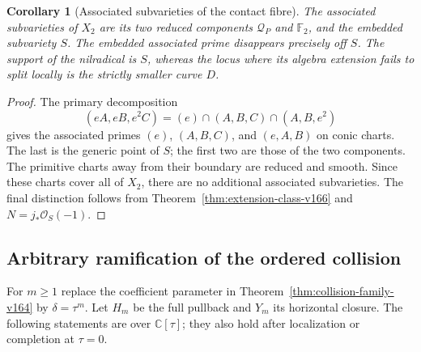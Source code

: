 \documentclass[11pt,reqno]{amsart}
\numberwithin{equation}{section}
\newtheorem{corollary}[theorem]{Corollary}
\theoremstyle{definition}\newtheorem{definition}[theorem]{Definition}
\theoremstyle{remark}\newtheorem{remark}[theorem]{Remark}
\newcommand{\C}{\mathbb C}\newcommand{\Q}{\mathbb Q}
\newcommand{\OO}{\mathcal O}\newcommand{\II}{\mathcal I}
\begin{document}
\begin{corollary}[Associated subvarieties of the contact fibre]
\label{cor:associated-v166}
The associated subvarieties of $X_2$ are its two reduced components
$\mathcal Q_P$ and $\mathbb F_2$, and the embedded subvariety $S$.
The embedded associated prime disappears precisely off $S$.
The support of the nilradical is $S$, whereas the locus where its
algebra extension fails to split locally is the strictly smaller
curve $D$.
\end{corollary}
\begin{proof}
The primary decomposition
\[
 (eA,eB,e^2C)=(e)\cap(A,B,C)\cap(A,B,e^2)
\]
gives the associated primes $(e)$, $(A,B,C)$, and $(e,A,B)$ on
conic charts. The last is the generic point of $S$; the first two
are those of the two components. The primitive charts away from
their boundary are reduced and smooth. Since these charts cover
all of $X_2$, there are no additional associated subvarieties.
The final distinction follows from
Theorem~\ref{thm:extension-class-v166} and $N=j_*\OO_S(-1)$.
\end{proof}

\subsection{Arbitrary ramification of the ordered collision}
For $m\geq1$ replace the coefficient parameter in
Theorem~\ref{thm:collision-family-v164} by $\delta=\tau^m$.
Let $H_m$ be the full pullback and $Y_m$ its horizontal closure.
The following statements are over $\C[\tau]$; they also hold after
localization or completion at $\tau=0$.
\end{document}
